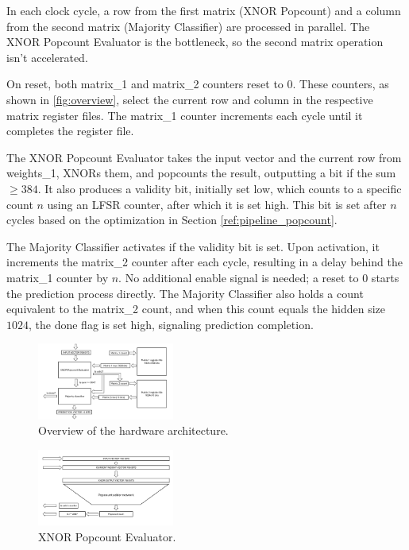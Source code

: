 \documentclass[conference]{IEEEtran}
\begin{document}
In each clock cycle, a row from the first matrix (XNOR Popcount) and a column from the second matrix (Majority Classifier) are processed in parallel. The XNOR Popcount Evaluator is the bottleneck, so the second matrix operation isn't accelerated. 

On reset, both matrix\_1 and matrix\_2 counters reset to 0. These counters, as shown in \autoref{fig:overview}, select the current row and column in the respective matrix register files. The matrix\_1 counter increments each cycle until it completes the register file. 

The XNOR Popcount Evaluator takes the input vector and the current row from weights\_1, XNORs them, and popcounts the result, outputting a bit if the sum $\geq 384$. It also produces a validity bit, initially set low, which counts to a specific count $n$ using an LFSR counter, after which it is set high. This bit is set after $n$ cycles based on the optimization in Section \ref{ref:pipeline_popcount}.

The Majority Classifier activates if the validity bit is set. Upon activation, it increments the matrix\_2 counter after each cycle, resulting in a delay behind the matrix\_1 counter by $n$. No additional enable signal is needed; a reset to 0 starts the prediction process directly. The Majority Classifier also holds a count equivalent to the matrix\_2 count, and when this count equals the hidden size $1024$, the done flag is set high, signaling prediction completion.




\begin{figure}[h]
    \centering
    \includegraphics[width=0.4\textwidth]{overview.pdf}
    \caption{Overview of the hardware architecture.}
    \label{fig:overview}
\end{figure}

\begin{figure}[h]
    \centering
    \includegraphics[width=0.4\textwidth]{Xnor_popcount.pdf}
    \caption{XNOR Popcount Evaluator.}
    \label{fig:xnor_popcount}
\end{figure}
\end{document}
